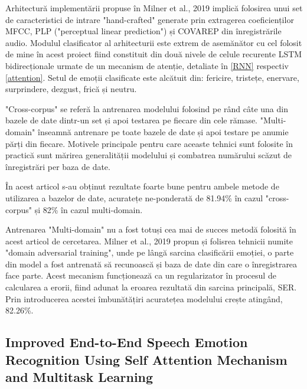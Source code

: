 \documentclass[a4paper,12pt]{book}
\begin{document}
					Arhitectură implementării propuse în Milner et al., 2019 \cite{multi-domain} implică folosirea unui set de caracteristici de intrare "hand-crafted" generate prin extragerea coeficienților MFCC, PLP ("perceptual linear prediction") și COVAREP \cite{covarep} din înregistrările audio. Modulul clasificator al arhitecturii este extrem de asemănător cu cel folosit de mine în acest proiect fiind constituit din două nivele de celule recurente LSTM bidirecționale  urmate de un mecanism de atenție, detaliate în \ref{RNN} respectiv \ref{attention}. Setul de emoții clasificate este alcătuit din: fericire, tristețe, enervare, surprindere, dezgust, frică și neutru. \par
					
					"Cross-corpus" se referă la antrenarea modelului folosind pe rând câte una din bazele de date dintr-un set și apoi testarea pe fiecare din cele rămase. "Multi-domain" înseamnă antrenare pe toate bazele de date și apoi testare pe anumie părți din fiecare. Motivele principale pentru care aceaste tehnici sunt folosite în practică sunt mărirea generalității modelului și combatrea numărului scăzut de înregistrări per baza de date. \par
					
					În acest articol s-au obținut rezultate foarte bune pentru ambele metode de utilizarea a bazelor de date, acuratețe ne-ponderată de  81.94\% în cazul "cross-corpus" și 82\% în cazul multi-domain. \par					
					
					Antrenarea "Multi-domain" nu a fost totuși cea mai de succes metodă folosită în acest articol de cercetarea. Milner et al., 2019 \cite{multi-domain} propun și folisrea tehnicii numite "domain adversarial training", unde pe lângă sarcina clasificării emoției, o parte din model a fost antrenată să recunoască și baza de date din care o înregistrarea face parte. Acest mecanism funcționează ca un regularizator în procesul de calcularea a erorii, fiind adunat la eroarea rezultată din sarcina principală, SER. Prin introducerea acestei îmbunătățiri acuratețea modelului crește atingând, 82.26\%. \par
						
					\subsection{Improved End-to-End Speech Emotion Recognition Using Self Attention	Mechanism and Multitask Learning} \label{end-to-end2}
					
\end{document}
